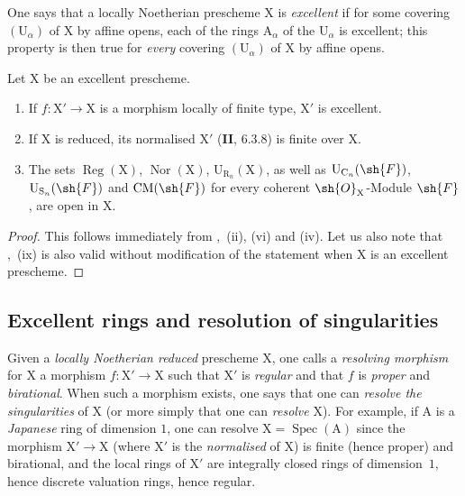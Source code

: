 \begin{env}[7.8.5]
\label{IV.7.8.5}
One says that a locally Noetherian prescheme $\mathrm{X}$ is \emph{excellent} if for some covering $(\mathrm{U}_\alpha)$ of $\mathrm{X}$ by affine opens, each of the rings $\mathrm{A}_\alpha$ of the $\mathrm{U}_\alpha$ is excellent; this property is then true for \emph{every} covering $(\mathrm{U}_\alpha)$ of $\mathrm{X}$ by affine opens.
\end{env}

\begin{proposition}[7.8.6]
\label{IV.7.8.6}
Let $\mathrm{X}$ be an excellent prescheme.
\begin{enumerate}[label=(\roman*)]
  \item If $f:\mathrm{X}'\to\mathrm{X}$ is a morphism locally of finite type, $\mathrm{X}'$ is excellent.


  \item If $\mathrm{X}$ is reduced, its normalised $\mathrm{X}'$ (\textbf{II}, $6.3.8$) is finite over $\mathrm{X}$.
  \item The sets $\operatorname{Reg}(\mathrm{X})$, $\operatorname{Nor}(\mathrm{X})$, $\mathrm{U}_{\mathrm{R}_n}(\mathrm{X})$, as well as $\mathrm{U}_{\mathrm{C}_n}(\sh{F})$, $\mathrm{U}_{\mathrm{S}_n}(\sh{F})$ and $\mathrm{CM}(\sh{F})$ for every coherent $\sh{O}_\mathrm{X}$-Module $\sh{F}$, are open in $\mathrm{X}$.
\end{enumerate}
\end{proposition}

\begin{proof}
This follows immediately from ,~(ii), (vi) and (iv). Let us also note that ,~(ix) is also valid without modification of the statement when $\mathrm{X}$ is an excellent prescheme.
\end{proof}


\subsection{Excellent rings and resolution of singularities}
\label{subsection:IV.7.9}

\begin{env}[7.9.1]
\label{IV.7.9.1}
Given a \emph{locally Noetherian reduced} prescheme $\mathrm{X}$, one calls a \emph{resolving morphism} for $\mathrm{X}$ a morphism $f:\mathrm{X}'\to\mathrm{X}$ such that $\mathrm{X}'$ is \emph{regular} and that $f$ is \emph{proper} and \emph{birational}. When such a morphism exists, one says that one can \emph{resolve the singularities} of $\mathrm{X}$ (or more simply that one can \emph{resolve} $\mathrm{X}$). For example, if $\mathrm{A}$ is a \emph{Japanese} ring of dimension $1$, one can resolve $\mathrm{X}=\operatorname{Spec}(\mathrm{A})$ since the morphism $\mathrm{X}'\to\mathrm{X}$ (where $\mathrm{X}'$ is the \emph{normalised} of $\mathrm{X}$) is finite (hence proper) and birational, and the local rings of $\mathrm{X}'$ are integrally closed rings of dimension~$1$, hence discrete valuation rings, hence regular.
\end{env}

